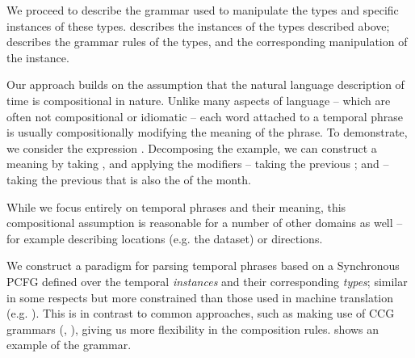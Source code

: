 We proceed to describe the grammar used to manipulate the types and specific
	instances of these types.
 describes the instances of the types described
	above;  describes the grammar rules of the types,
	and the corresponding manipulation of the instance.

Our approach builds on the assumption that the natural language description
	of time is compositional in nature.
Unlike many aspects of language  -- which are often not compositional or
	idiomatic -- each word attached to a temporal phrase is 
	usually compositionally modifying the meaning of the phrase.
To demonstrate, we consider the expression .
Decomposing the example, we can construct a meaning by taking ,
	and applying the modifiers  -- taking the previous ;
	and  -- taking the previous  that is
	also the  of the month.

While we focus entirely on temporal phrases and their meaning, this
	compositional assumption is reasonable for a number of other domains as 
	well -- for example describing locations (e.g. the 
	 dataset) or directions.

We construct a paradigm for parsing temporal phrases based on a Synchronous
	PCFG defined over the temporal \textit{instances} and their
	corresponding \textit{types}; similar in some respects but more
	constrained than those used in machine translation 
	(e.g. ).
This is in contrast to common approaches, such as making use of CCG 
	grammars (, ),
	giving us more flexibility in the composition rules.
 shows an example of the grammar.

